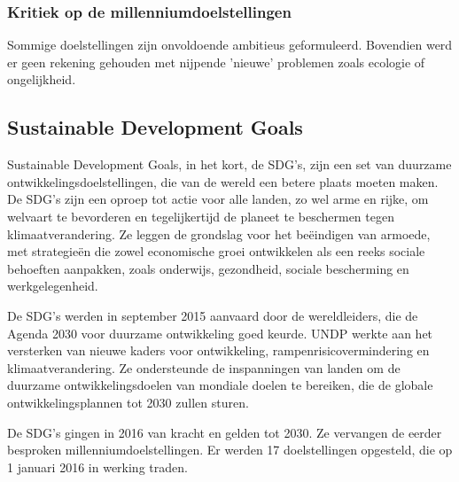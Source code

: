  \subsubsection{Kritiek op de millenniumdoelstellingen}
 Sommige doelstellingen zijn onvoldoende ambitieus geformuleerd. Bovendien werd er geen rekening gehouden met nijpende 'nieuwe' problemen zoals ecologie of ongelijkheid.

\subsection{Sustainable Development Goals}
Sustainable Development Goals, in het kort, de SDG's, zijn een set van duurzame ontwikkelingsdoelstellingen, die van de wereld een betere plaats moeten maken. De SDG’s zijn een oproep tot actie voor alle landen, zo wel arme en rijke, om welvaart te bevorderen en tegelijkertijd de planeet te beschermen tegen klimaatverandering. Ze leggen de grondslag voor het beëindigen van armoede, met strategieën die zowel economische groei ontwikkelen als een reeks sociale behoeften aanpakken, zoals onderwijs, gezondheid, sociale bescherming en werkgelegenheid. \autocite{VerenigdeNaties2004}

De SDG's werden in september 2015 aanvaard door de wereldleiders, die de Agenda 2030 voor duurzame ontwikkeling goed keurde. UNDP werkte aan het versterken van nieuwe kaders voor ontwikkeling, rampenrisicovermindering en klimaatverandering. Ze ondersteunde de inspanningen van landen om de duurzame ontwikkelingsdoelen van mondiale doelen te bereiken, die de globale ontwikkelingsplannen tot 2030 zullen sturen.

De SDG's gingen in 2016 van kracht en gelden tot 2030. Ze vervangen de eerder besproken millenniumdoelstellingen. Er werden 17 doelstellingen opgesteld, die op 1 januari 2016 in werking traden. \autocite{DevelopmentProgram2020}
 
